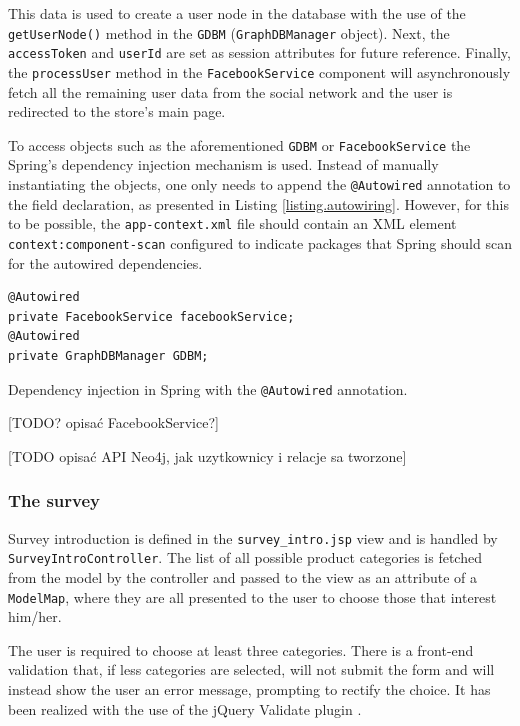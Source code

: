 \documentclass[12pt]{report}
\begin{document}
This data is used to create a user node in the database with the use of the \texttt{getUserNode()} method in the \texttt{GDBM} (\texttt{Graph\-DB\-Manager} object). Next, the \texttt{access\-Token} and \texttt{userId} are set as session attributes for future reference. Finally, the \texttt{process\-User} method in the \texttt{Facebook\-Service} component will asynchronously fetch all the remaining user data from the social network and the user is redirected to the store's main page.

\hbox{}
To access objects such as the aforementioned \texttt{GDBM} or \texttt{Facebook\-Service} the Spring's dependency injection mechanism is used. Instead of manually instantiating the objects, one only needs to append the \texttt{@Autowired} annotation to the field declaration, as presented in Listing \ref{listing.autowiring}. However, for this to be possible, the \texttt{app-context.xml} file should contain an XML element \texttt{context:\-component\--scan} configured to indicate packages that Spring should scan for the autowired dependencies.

\begin{listing}
\begin{verbatim}
@Autowired
private FacebookService facebookService;
@Autowired
private GraphDBManager GDBM;
\end{verbatim}
\caption{Dependency injection in Spring with the \texttt{@Autowired} annotation.}
\label{listing.autowiring}
\end{listing}

[TODO? opisać FacebookService?]

[TODO opisać API Neo4j, jak uzytkownicy i relacje sa tworzone]

\subsubsection{The survey}

Survey introduction is defined in the \texttt{survey\-\_intro\-.jsp} view and is handled by \texttt{Survey\-Intro\-Controller}. The list of all possible product categories is fetched from the model by the controller and passed to the view as an attribute of a \texttt{Model\-Map}, where they are all presented to the user to choose those that interest him/her. 

The user is required to choose at least three categories. There is a front-end validation that, if less categories are selected, will not submit the form and will instead show the user an error message, prompting to rectify the choice. It has been realized with the use of the jQuery Validate plugin \cite{jquery_validate}.
\end{document}
